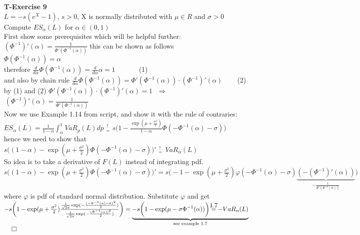 \documentclass[11pt]{article}
\newcommand\myexmpl{\stackrel{\mathclap{\normalfont\mbox{1.7}}}{=}}
\begin{document}
\noindent
\textbf{T-Exercise 9}
\\[7pt] $L=-s(e^X-1)$, $s>0$, X is normally distributed with $\mu \in R$ and $\sigma > 0$
\\[5pt] Compute $ES_{\alpha}(L)$ for $\alpha \in (0,1)$
\\[5pt] First show some prerequisites which will be helpful further:
\\[5pt] $(\Phi^{-1})'(\alpha)=\frac{1}{\Phi'(\Phi^{-1}(\alpha))}$ this can be shown as follows
\\[5pt] $\Phi(\Phi^{-1}(\alpha))=\alpha$
\\[5pt] therefore $\frac{d}{d \alpha}\Phi(\Phi^{-1}(\alpha))=\frac{d}{d \alpha}\alpha=1 \,\,\,\,\,\,\,\,\,\,\,\,\,\,\,\,\,\,\,$			(1)
\\[5pt] and also by chain rule $\frac{d}{d \alpha}\Phi(\Phi^{-1}(\alpha))=\Phi'(\Phi^{-1}(\alpha)) \cdot (\Phi^{-1})'(\alpha) \,\,\,\,\,\,\,\,\,\,\,$		(2)
\\[5pt] by (1) and (2) $\Phi'(\Phi^{-1}(\alpha)) \cdot (\Phi^{-1})'(\alpha)=1\,$ $\, \Longrightarrow \,$ $\, (\Phi^{-1})'(\alpha)=\frac{1}{\Phi'(\Phi^{-1}(\alpha))}$
\\[20pt] Now we use Example 1.14 from script, and show it with the rule of contraries:
\\[5pt] $ES_{\alpha}(L)= \frac{1}{1-\alpha} \int^1_{\alpha}VaR_p(L)dp \,\, {}^{\,!}_{=} \,\, s\bigg(1 - \frac{\exp(\mu + \frac{\sigma^2}{2})}{1-\alpha} 
	\Phi(-\Phi^{-1}(\alpha)-\sigma) \bigg)$
\\[5pt] hence we need to show that
\\[5pt] $s\bigg( (1 - \alpha) - \exp(\mu + \frac{\sigma^2}{2}) \Phi(-\Phi^{-1}(\alpha)-\sigma) \bigg)' \,\, {}^{\,!}_{=} \,\ VaR_{\alpha}(L)$
\\[5pt] So idea is to take a derivative of $F(L)$ instead of integrating pdf.
\\[5pt] $s\bigg( (1 - \alpha) - \exp(\mu + \frac{\sigma^2}{2}) \Phi(-\Phi^{-1}(\alpha)-\sigma) \bigg)' = 
	s\bigg(-1-\exp(\mu + \frac{\sigma^2}{2}) \varphi(-\Phi^{-1}(\alpha)-\sigma) 
	\underbrace{(-(\Phi^{-1})'(\alpha))}_\text{$-\frac{1}{\Phi'(\Phi^{-1}(\alpha))}$} \bigg)$
\\[5pt] where $\varphi$ is pdf of standard normal distribution. Substitute $\varphi$ and get
\\[5pt] $-s\bigg(1-\exp(\mu + \frac{\sigma^2}{2}) \frac{ \frac{1}{\sqrt{2\pi}} \exp(-\frac{(-\Phi^{-1}(\alpha)-\sigma)^2}{2}) }{ \frac{1}{\sqrt{2\pi}} \exp(
	-\frac{(\Phi^{-1}(\alpha))^2}{2}) } \bigg) = 
	\underbrace{-s\bigg(1-\exp(\mu-\sigma \Phi^{-1}(\alpha) ) \bigg) \myexmpl - VaR_{\alpha}(L)}_\text{see example 1.7}$ $\,\,\,\,\, \Box$
\end{document}
